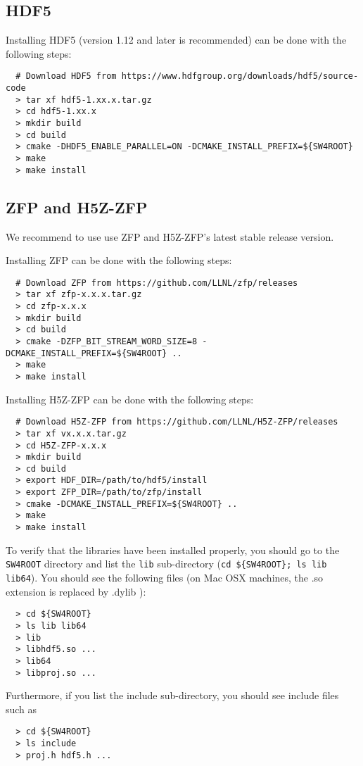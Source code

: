 \documentclass[11pt]{article}
\begin{document}
\subsection{HDF5}
Installing HDF5 (version 1.12 and later is recommended) can be done with the following steps:
\begin{verbatim}
  # Download HDF5 from https://www.hdfgroup.org/downloads/hdf5/source-code
  > tar xf hdf5-1.xx.x.tar.gz
  > cd hdf5-1.xx.x
  > mkdir build
  > cd build
  > cmake -DHDF5_ENABLE_PARALLEL=ON -DCMAKE_INSTALL_PREFIX=${SW4ROOT}
  > make
  > make install
\end{verbatim}

\subsection{ZFP and H5Z-ZFP}
We recommend to use use ZFP and H5Z-ZFP's latest stable release version. 

Installing ZFP can be done with the following steps:
\begin{verbatim}
  # Download ZFP from https://github.com/LLNL/zfp/releases
  > tar xf zfp-x.x.x.tar.gz
  > cd zfp-x.x.x
  > mkdir build
  > cd build
  > cmake -DZFP_BIT_STREAM_WORD_SIZE=8 -DCMAKE_INSTALL_PREFIX=${SW4ROOT} ..
  > make
  > make install
\end{verbatim}

Installing H5Z-ZFP can be done with the following steps:
\begin{verbatim}
  # Download H5Z-ZFP from https://github.com/LLNL/H5Z-ZFP/releases
  > tar xf vx.x.x.tar.gz
  > cd H5Z-ZFP-x.x.x
  > mkdir build
  > cd build
  > export HDF_DIR=/path/to/hdf5/install
  > export ZFP_DIR=/path/to/zfp/install
  > cmake -DCMAKE_INSTALL_PREFIX=${SW4ROOT} ..
  > make
  > make install
\end{verbatim}

To verify that the libraries have been installed properly, you should go to the \verb+SW4ROOT+
directory and list the {\tt lib} sub-directory (\verb+cd ${SW4ROOT}; ls lib lib64+). You should see the
following files (on Mac OSX machines, the .so extension is replaced by .dylib ):
\begin{verbatim}
  > cd ${SW4ROOT}
  > ls lib lib64
  > lib
  > libhdf5.so ...
  > lib64
  > libproj.so ...
\end{verbatim}

Furthermore, if you list the include sub-directory, you should see include files such as 
\begin{verbatim}
  > cd ${SW4ROOT}
  > ls include
  > proj.h hdf5.h ...
\end{verbatim}
\end{document}
